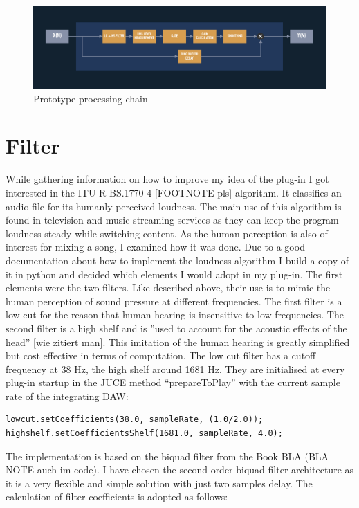 \begin{figure}
\includegraphics[width=\textwidth]{images/chain01}
\caption{Prototype processing chain}
\end{figure}

\section{Filter}

While gathering information on how to improve my idea of the plug-in I got interested in the ITU-R BS.1770-4 [FOOTNOTE pls] algorithm. It classifies an audio file for its humanly perceived loudness. The main use of this algorithm is found in television and music streaming services as they can keep the program loudness steady while switching content. As the human perception is also of interest for mixing a song, I examined how it was done. Due to a good documentation about how to implement the loudness algorithm I build a copy of it in python and decided which elements I would adopt in my plug-in. The first elements were the two filters. Like described above, their use is to mimic the human perception of sound pressure at different frequencies. The first filter is a low cut for the reason that human hearing is insensitive to low frequencies. The second filter is a high shelf and is ”used to account for the acoustic effects of the head” [wie zitiert man]. This imitation of the human hearing is greatly simplified but cost effective in terms of computation. The low cut filter has a cutoff frequency at 38 Hz, the high shelf around 1681 Hz. They are initialised at every plug-in startup in the JUCE method “prepareToPlay” with the current sample rate of the integrating DAW:\\

\lstset{language=C++}
\begin{lstlisting}[frame=single]
lowcut.setCoefficients(38.0, sampleRate, (1.0/2.0));
highshelf.setCoefficientsShelf(1681.0, sampleRate, 4.0);
\end{lstlisting}

The implementation is based on the biquad filter from the Book BLA (BLA NOTE auch im code).  I have chosen the second order biquad filter architecture as it is a very flexible and simple solution with just two samples delay. The calculation of filter coefficients is adopted as follows:

